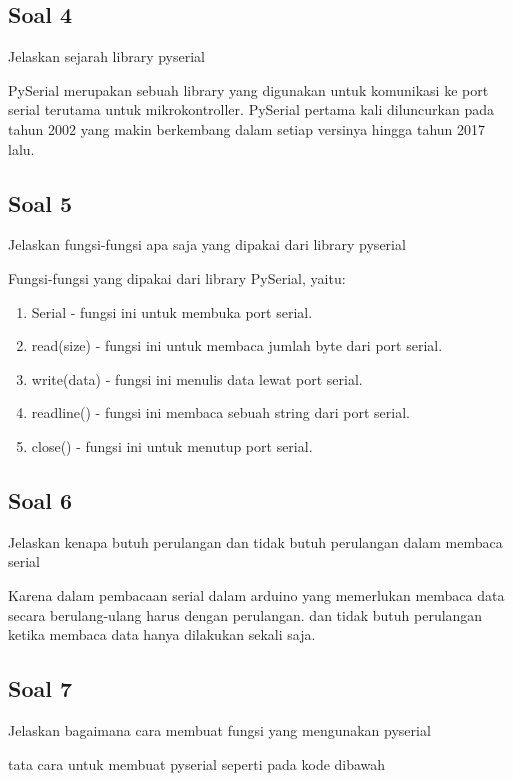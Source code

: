 \subsection{Soal 4}
Jelaskan sejarah library pyserial

PySerial merupakan sebuah library yang digunakan untuk komunikasi ke port serial terutama untuk mikrokontroller. PySerial pertama kali diluncurkan pada tahun 2002 yang makin berkembang dalam setiap versinya hingga tahun 2017 lalu.

\subsection{Soal 5}
Jelaskan fungsi-fungsi apa saja yang dipakai dari library pyserial

Fungsi-fungsi yang dipakai dari library PySerial, yaitu:
\begin{enumerate}
	\item Serial - fungsi ini untuk membuka port serial.
	\item read(size) - fungsi ini untuk membaca jumlah byte dari port serial.
	\item write(data) - fungsi ini menulis data lewat port serial.
	\item readline() - fungsi ini membaca sebuah string dari port serial.
	\item close() - fungsi ini untuk menutup port serial.
\end{enumerate}

\subsection{Soal 6}
Jelaskan kenapa butuh perulangan dan tidak butuh perulangan dalam membaca serial

Karena dalam pembacaan serial dalam arduino yang memerlukan membaca data secara berulang-ulang harus dengan perulangan. dan tidak butuh perulangan ketika membaca data hanya dilakukan sekali saja.

\subsection{Soal 7}
Jelaskan bagaimana cara membuat fungsi yang mengunakan pyserial

tata cara untuk membuat pyserial seperti pada kode dibawah




